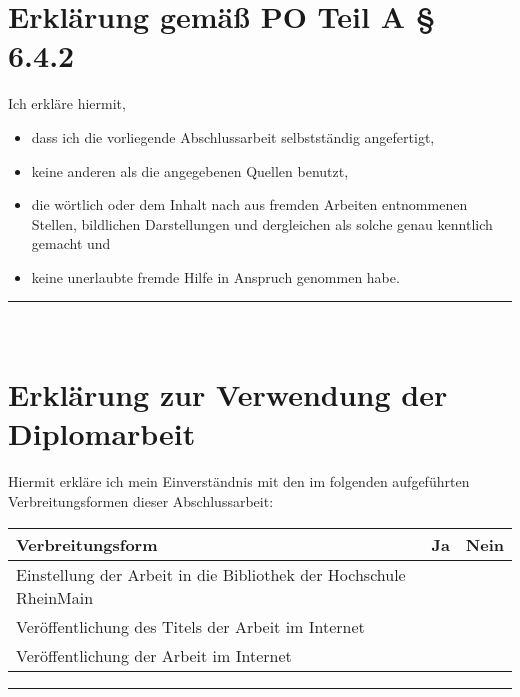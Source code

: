 \section*{Erklärung gemäß PO Teil A § 6.4.2}

Ich erkläre hiermit,
\begin{itemize}
	\item dass ich die vorliegende Abschlussarbeit selbstständig angefertigt,
	\item keine anderen als die angegebenen Quellen benutzt,
	\item die wörtlich oder dem Inhalt nach aus fremden Arbeiten entnommenen Stellen, bildlichen Darstellungen und dergleichen als solche genau kenntlich gemacht und
	\item keine unerlaubte fremde Hilfe in Anspruch genommen habe.
\end{itemize}

\vspace{3cm}
\makebox[.45\linewidth][l]{\thecity, \thedate}\hfill\rule{.45\linewidth}{0.5pt}\\
\makebox[.45\linewidth][l]{}\hfill\makebox[.45\linewidth][l]{\theauthor}

\vfill

\section*{Erklärung zur Verwendung der Diplomarbeit}

Hiermit erkläre ich mein Einverständnis mit den im folgenden aufgeführten Verbreitungsformen dieser Abschlussarbeit:

\begin{tabularx}{\linewidth}{|R|c|c|}
	\hline
	\textbf{Verbreitungsform} & \textbf{Ja} & \textbf{Nein}
	\\\hline
	Einstellung der Arbeit in die Bibliothek der Hochschule RheinMain &  & 
	\\\hline
	Veröffentlichung des Titels der Arbeit im Internet &  & 
	\\\hline
	Veröffentlichung der Arbeit im Internet &  & 
	\\\hline
\end{tabularx}

\vspace{3cm}
\makebox[.45\linewidth][l]{\thecity, \thedate}\hfill\rule{.45\linewidth}{0.5pt}\\
\makebox[.45\linewidth][l]{}\hfill\makebox[.45\linewidth][l]{\theauthor}
